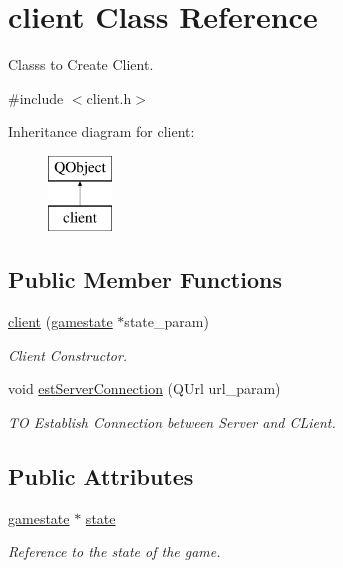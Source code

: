 \hypertarget{classclient}{}\section{client Class Reference}
\label{classclient}


Classs to Create Client.  




{\ttfamily \#include $<$client.\+h$>$}

Inheritance diagram for client\+:\begin{figure}[H]
\begin{center}
\leavevmode
\includegraphics[height=2.000000cm]{classclient}
\end{center}
\end{figure}
\subsection*{Public Member Functions}
\begin{DoxyCompactItemize}
\item 
\hyperlink{classclient_a9ea8d82dfe1a28c0e44d37a61eedef8d}{client} (\hyperlink{classgamestate}{gamestate} $\ast$state\+\_\+param)
\begin{DoxyCompactList}\small\item\em Client Constructor. \end{DoxyCompactList}\item 
void \hyperlink{classclient_a573ec47d9b5e3829ea9eab522dd17394}{est\+Server\+Connection} (Q\+Url url\+\_\+param)
\begin{DoxyCompactList}\small\item\em TO Establish Connection between Server and C\+Lient. \end{DoxyCompactList}\end{DoxyCompactItemize}
\subsection*{Public Attributes}
\begin{DoxyCompactItemize}
\item 
\mbox{\label{classclient_a7e0f2990d3dcaaf5347ee0ed4a863e86}} 
\hyperlink{classgamestate}{gamestate} $\ast$ \hyperlink{classclient_a7e0f2990d3dcaaf5347ee0ed4a863e86}{state}
\begin{DoxyCompactList}\small\item\em Reference to the state of the game. \end{DoxyCompactList}\end{DoxyCompactItemize}


